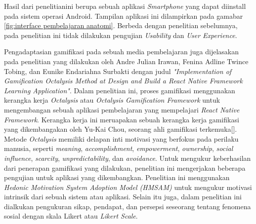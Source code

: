 Hasil dari penelitianini berupa sebuah aplikasi \textit{Smartphone} yang dapat diinstall pada sistem operasi Android.
Tampilan aplikasi ini dilampirkan pada gamabar \ref*{fig:interface pembelajaran anatomi}.
Berbeda dengan penelitian sebelumnya, pada penelitian ini tidak dilakukan pengujian \textit{Usability} dan \textit{User Experience}.

Pengadaptasian gamifikasi pada sebuah media pembelajaran juga dijelasakan pada penelitian yang dilakukan oleh Andre Julian Irawan, Fenina Adline Twince Tobing, dan Eunike Endariahna Surbakti
dengan judul \textit{"Implementation of Gamification Octalysis Method at Design and Build a React Native Framework Learning Application"}.
Dalam penelitian ini, proses gamifikasi menggunakan kerangka kerja \textit{Octalysis} atau \textit{Octalysis Gamification Framework} untuk mengembangan sebuah aplikasi pembelajaran yang mempelajari \textit{React Native Framework}.
Kerangka kerja ini meruapakan sebuah kerangka kerja gamifikasi yang dikembangakan oleh Yu-Kai Chou, seorang ahli gamifikasi terkemuka[].
Metode \textit{Octalysis} memiliki delapan inti motivasi yang berfokus pada perilaku manusia, seperti \textit{meaning}, \textit{accomplishment}, \textit{empowerment}, \textit{ownership}, \textit{social influence}, \textit{scarcity}, \textit{unpredictability}, dan \textit{avoidance}.
Untuk mengukur keberhasilan dari penerapan gamifikasi yang dilakukan, penelitian ini mengerjakan beberapa pengujian untuk aplikasi yang dikembangkan.
Penelitian ini menggunakan \textit{Hedonic Motivation System Adoption Model (HMSAM)} untuk mengukur motivasi intrinsik dari sebuah sistem atau aplikasi.
Selain itu juga, dalam penelitian ini dialkukan pengukuran sikap, pendapat, dan persepsi seseorang tentang fenomena sosial dengan skala Likert atau \textit{Likert Scale}.
\newpage
